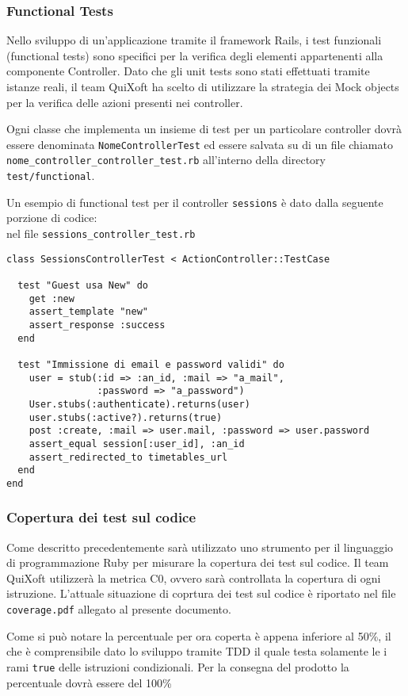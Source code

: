 \documentclass[11pt,a4paper]{article}
\begin{document}
\subsubsection{Functional Tests}
Nello sviluppo di un'applicazione tramite il framework Rails, i test funzionali (functional tests) sono specifici per la verifica degli elementi appartenenti alla componente Controller. Dato che gli unit tests sono stati effettuati tramite istanze reali, il team QuiXoft ha scelto di utilizzare la strategia dei Mock objects per la verifica delle azioni presenti nei controller.

Ogni classe che implementa un insieme di test per un particolare controller dovrà essere denominata \verb|NomeControllerTest| ed essere salvata su di un file chiamato \verb|nome_controller_controller_test.rb| all'interno della directory \verb|test/functional|.

Un esempio di functional test per il controller \verb|sessions| è dato dalla seguente porzione di codice: \\
nel file \verb|sessions_controller_test.rb|
\begin{verbatim}
class SessionsControllerTest < ActionController::TestCase

  test "Guest usa New" do
    get :new
    assert_template "new"
    assert_response :success
  end

  test "Immissione di email e password validi" do
    user = stub(:id => :an_id, :mail => "a_mail",
                :password => "a_password")
    User.stubs(:authenticate).returns(user)
    user.stubs(:active?).returns(true)
    post :create, :mail => user.mail, :password => user.password
    assert_equal session[:user_id], :an_id
    assert_redirected_to timetables_url
  end
end
\end{verbatim}
\subsubsection{Copertura dei test sul codice}
Come descritto precedentemente sarà utilizzato uno strumento per il linguaggio di programmazione Ruby per misurare la copertura dei test sul codice. Il team QuiXoft utilizzerà la metrica C0, ovvero sarà controllata la copertura di ogni istruzione. L'attuale situazione di coprtura dei test sul codice è riportato nel file \verb|coverage.pdf| allegato al presente documento.

Come si può notare la percentuale per ora coperta è appena inferiore al 50\%, il che è comprensibile dato lo sviluppo tramite TDD il quale testa solamente le i rami \verb|true| delle istruzioni condizionali. Per la consegna del prodotto la percentuale dovrà essere del 100\%
\end{document}
